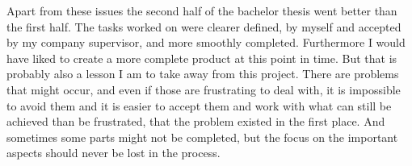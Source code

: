 \documentclass[a4paper]{report}
\begin{document}
Apart from these issues the second half of the bachelor thesis went better than the first half. The tasks worked on were clearer defined, by myself and accepted by my company supervisor, and more smoothly  completed. Furthermore I would have liked to create a more complete product at this point in time. But that is probably also a lesson I am to take away from this project. There are problems that might occur, and even if those are frustrating to deal with, it is impossible to avoid them and it is easier to accept them and work with what can still be achieved than be frustrated, that the problem existed in the first place. And sometimes some parts might not be completed, but the focus on the important aspects should never be lost in the process.
\end{document}
